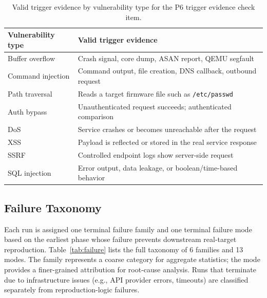 \begin{table}[t]
\centering

\small
\begin{tabular}{l l}
\toprule
\textbf{Vulnerability type} & \textbf{Valid trigger evidence} \\
\midrule
Buffer overflow & Crash signal, core dump, ASAN report, QEMU segfault \\
Command injection & Command output, file creation, DNS callback, outbound request \\
Path traversal & Reads a target firmware file such as \texttt{/etc/passwd} \\
Auth bypass & Unauthenticated request succeeds; authenticated comparison \\
DoS & Service crashes or becomes unreachable after the request \\
XSS & Payload is reflected or stored in the real service response \\
SSRF & Controlled endpoint logs show server-side request \\
SQL injection & Error output, data leakage, or boolean/time-based behavior \\
\bottomrule
\end{tabular}
\caption{Valid trigger evidence by vulnerability type for the P6 trigger evidence check item.}
\label{tab:trigger}
\end{table}

\subsection{Failure Taxonomy}
\label{app:failure}

Each run is assigned one terminal failure family and one terminal failure mode based on the earliest phase whose failure prevents downstream real-target reproduction. Table~\ref{tab:failure} lists the full taxonomy of 6 families and 13 modes. The family represents a coarse category for aggregate statistics; the mode provides a finer-grained attribution for root-cause analysis. Runs that terminate due to infrastructure issues (e.g., API provider errors, timeouts) are classified separately from reproduction-logic failures.

